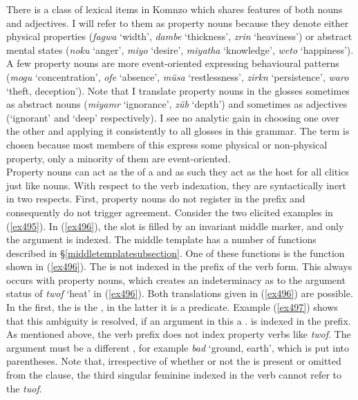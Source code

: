 There is a class of lexical items in Komnzo which shares features of both nouns and adjectives. I will refer to them as property nouns because they denote either physical properties (\emph{fagwa} `width', \emph{dambe} `thickness', \emph{zrin} `heaviness') or abstract mental states (\emph{noku} `anger', \emph{miyo} `desire', \emph{miyatha} `knowledge', \emph{weto} `happiness'). A few property nouns are more event-oriented expressing behavioural patterns (\emph{mogu} `concentration', \emph{ofe} `absence', \emph{müsa} `restlessness', \emph{zirkn} `persistence', \emph{waro} `theft, deception'). Note that I translate property nouns in the glosses sometimes as abstract nouns (\emph{miyamr} `ignorance', \emph{züb} `depth') and sometimes as adjectives (`ignorant' and `deep' respectively). I see no analytic gain in choosing one over the other and applying it consistently to all glosses in this grammar. The term  is chosen because most members of this  express some physical or non-physical property, only a minority of them are event-oriented.\\

Property nouns can act as the  of a  and as such they act as the host for all  clitics just like nouns. With respect to the verb indexation, they are syntactically inert in two respects. First, property nouns do not register in the  prefix and consequently do not trigger  agreement. Consider the two elicited examples in (\ref{ex495}). In (\ref{ex496}), the  slot is filled by an invariant middle marker, and only the  argument is indexed. The middle template has a number of functions described in \S{}\ref{middletemplatesubsection}. One of these functions is the  function shown in (\ref{ex496}). The  is not indexed in the  prefix of the verb form. This always occurs with property nouns, which creates an indeterminacy as to the argument status of \emph{twof} `heat' in (\ref{ex496}). Both translations given in (\ref{ex496}) are possible. In the first, the  is the , in the latter it is a  predicate. Example (\ref{ex497}) shows that this ambiguity is resolved, if an argument \textendash{} in this  a \Tsg.\F{} \textendash{} is indexed in the prefix. As mentioned above, the verb prefix does not index property verbs like \emph{twof}. The  argument must be a different , for example \emph{bad} `ground, earth', which is put into parentheses. Note that, irrespective of whether or not the   is present or omitted from the clause, the third singular feminine indexed in the verb cannot refer to the  \emph{tuof}.

